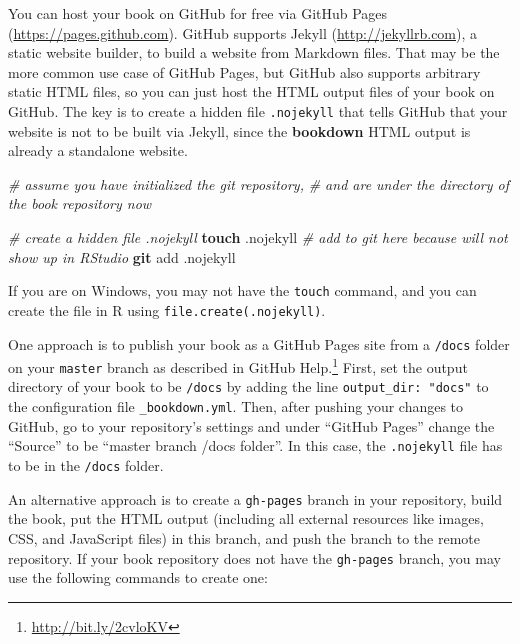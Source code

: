 \documentclass[
  12pt,
]{krantz}
\newenvironment{Shaded}{\begin{snugshade}}{\end{snugshade}}
\newcommand{\CommentTok}[1]{\textcolor[rgb]{0.56,0.35,0.01}{\textit{#1}}}
\newcommand{\FunctionTok}[1]{\textcolor[rgb]{0.13,0.29,0.53}{\textbf{#1}}}
\newcommand{\NormalTok}[1]{#1}
\renewcommand{\href}[2]{#2\footnote{\url{#1}}}
\theoremstyle{definition}
\theoremstyle{definition}
\theoremstyle{definition}
\theoremstyle{definition}
\theoremstyle{remark}
\begin{document}
You can host your book on GitHub for free via GitHub Pages (\url{https://pages.github.com}). GitHub supports Jekyll (\url{http://jekyllrb.com}), a static website builder, to build a website from Markdown files. That may be the more common use case of GitHub Pages, but GitHub also supports arbitrary static HTML files, so you can just host the HTML output files of your book on GitHub. The key is to create a hidden file \texttt{.nojekyll} that tells GitHub that your website is not to be built via Jekyll, since the \textbf{bookdown} HTML output is already a standalone website.

\begin{Shaded}
\begin{Highlighting}[]
\CommentTok{\# assume you have initialized the git repository,}
\CommentTok{\# and are under the directory of the book repository now}

\CommentTok{\# create a hidden file .nojekyll}
\FunctionTok{touch}\NormalTok{ .nojekyll}
\CommentTok{\# add to git here because will not show up in RStudio}
\FunctionTok{git}\NormalTok{ add .nojekyll}
\end{Highlighting}
\end{Shaded}

If you are on Windows, you may not have the \texttt{touch} command, and you can create the file in R using \texttt{file.create(\textquotesingle{}.nojekyll\textquotesingle{})}.

One approach is to publish your book as a GitHub Pages site from a \texttt{/docs} folder on your \texttt{master} branch as described in \href{http://bit.ly/2cvloKV}{GitHub Help.} First, set the output directory of your book to be \texttt{/docs} by adding the line \texttt{output\_dir:\ "docs"} to the configuration file \texttt{\_bookdown.yml}. Then, after pushing your changes to GitHub, go to your repository's settings and under ``GitHub Pages'' change the ``Source'' to be ``master branch /docs folder''. In this case, the \texttt{.nojekyll} file has to be in the \texttt{/docs} folder.

An alternative approach is to create a \texttt{gh-pages} branch in your repository, build the book, put the HTML output (including all external resources like images, CSS, and JavaScript files) in this branch, and push the branch to the remote repository. If your book repository does not have the \texttt{gh-pages} branch, you may use the following commands to create one:
\end{document}
